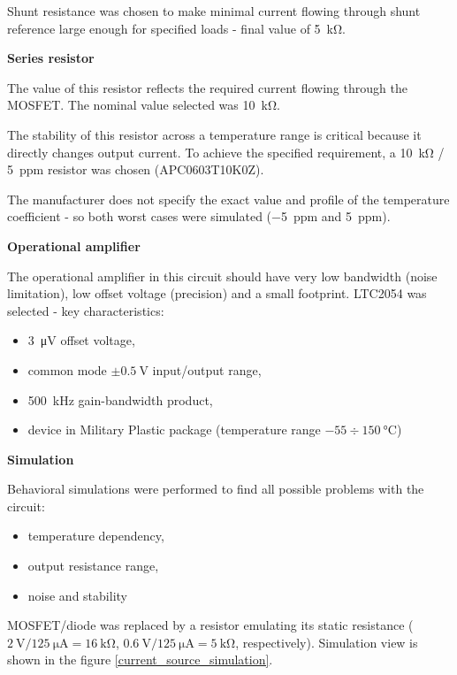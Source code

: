         Shunt resistance was chosen to make minimal current flowing through shunt reference large enough for specified loads - final value of \SI{5}{\kilo\ohm}.

        \bigskip \textbf{Series resistor}

        The value of this resistor reflects the required current flowing through the MOSFET. The nominal value selected was \SI{10}{\kilo\ohm}.

        The stability of this resistor across a temperature range is critical because it directly changes output current. To achieve the specified requirement, a \SI{10}{\kilo\ohm} / \SI{5}{ppm} resistor was chosen (APC0603T10K0Z).

        The manufacturer does not specify the exact value and profile of the temperature coefficient - so both worst cases were simulated (\SI{-5}{ppm} and \SI{5}{ppm}).

        \bigskip \textbf{Operational amplifier}

        The operational amplifier in this circuit should have very low bandwidth (noise limitation), low offset voltage (precision) and a small footprint. LTC2054 was selected - key characteristics:
        \begin{itemize}
            \item \SI{3}{\micro\volt} offset voltage,
            \item common mode $\pm \SI{0.5}{\volt}$ input/output range,
            \item \SI{500}{\kilo\hertz} gain-bandwidth product,
            \item device in Military Plastic package (temperature range $-55 \div \SI{150}{\degreeCelsius}$)
        \end{itemize}

        \bigskip \textbf{Simulation}

        Behavioral simulations were performed to find all possible problems with the circuit:
        \begin{itemize}
            \item temperature dependency,
            \item output resistance range,
            \item noise and stability
        \end{itemize}

        MOSFET/diode was replaced by a resistor emulating its static resistance ($\SI{2}{\volt}/\SI{125}{\micro\ampere} = \SI{16}{\kilo\ohm}$, $\SI{0.6}{\volt}/\SI{125}{\micro\ampere} = \SI{5}{\kilo\ohm}$, respectively). Simulation view is shown in the figure \ref{current_source_simulation}.


